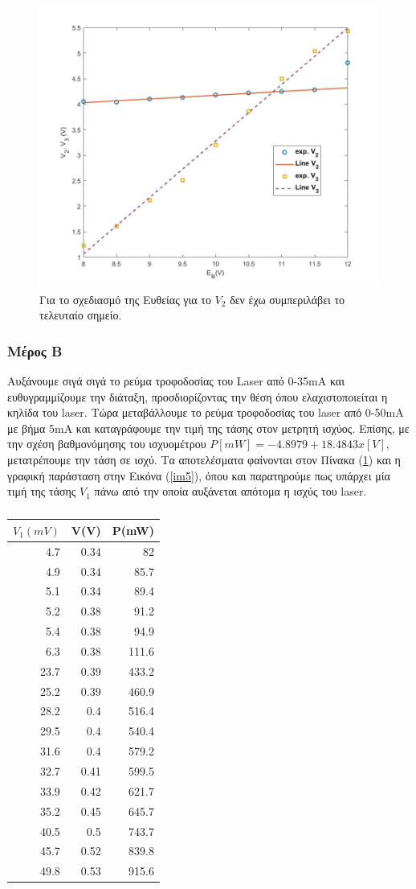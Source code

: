 \documentclass[a4paper]{article}
\begin{document}
		 \begin{figure}[h!]
		 	\centering
		 	\includegraphics[width=0.7\linewidth]{plot3.jpg}
		 	\caption{Για το σχεδιασμό της Ευθείας για το $V_2$ δεν έχω συμπεριλάβει το τελευταίο σημείο.}
		 	\label{im4}
		 \end{figure}
		 \newpage
		 
	\subsubsection*{Μέρος Β}
		Αυξάνουμε σιγά σιγά το ρεύμα τροφοδοσίας του Laser από 0-35mA και ευθυγραμμίζουμε την διάταξη, προσδιορίζοντας την θέση όπου ελαχιστοποιείται η κηλίδα του laser. Τώρα μεταβάλλουμε το ρεύμα τροφοδοσίας του laser από 0-50mA με βήμα 5mA και καταγράφουμε την τιμή της τάσης στον μετρητή ισχύος. Επίσης, με την σχέση βαθμονόμησης του ισχυομέτρου $P[mW] = -4.8979 + 18.4843x[V] $, μετατρέπουμε την τάση σε ισχύ. Τα αποτελέσματα φαίνονται στον Πίνακα (\ref{mat4}) και η γραφική παράσταση στην Εικόνα (\ref{im5}), όπου και παρατηρούμε πως υπάρχει μία τιμή της τάσης $V_1$ πάνω από την οποία αυξάνεται απότομα η ισχύς του laser.
		\begin{table}[h!]
			\centering
			\begin{tabular}{r|r|r}
				$V_1(mV)$ & V(V) & P(mW) \\\hline\hline
				4.7&0.34&82\\
4.9&0.34&85.7\\
5.1&0.34&89.4\\
5.2&0.38&91.2\\
5.4&0.38&94.9\\
6.3&0.38&111.6\\
23.7&0.39&433.2\\
25.2&0.39&460.9\\
28.2&0.4&516.4\\
29.5&0.4&540.4\\
31.6&0.4&579.2\\
32.7&0.41&599.5\\
33.9&0.42&621.7\\
35.2&0.45&645.7\\
40.5&0.5&743.7\\
45.7&0.52&839.8\\
49.8&0.53&915.6			
			\end{tabular}
			\caption{ }
			\label{mat4}
		\end{table}
	
\end{document}
